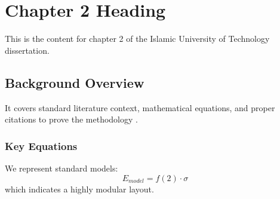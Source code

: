 \chapter{Chapter 2 Heading}
\label{ch:chapter2}
This is the content for chapter 2 of the Islamic University of Technology dissertation.

\section{Background Overview}
It covers standard literature context, mathematical equations, and proper citations to prove the methodology \cite{texbook}.

\subsection{Key Equations}
We represent standard models:
\begin{equation}
    E_{model} = f(2) \cdot \sigma
\end{equation}
which indicates a highly modular layout.
